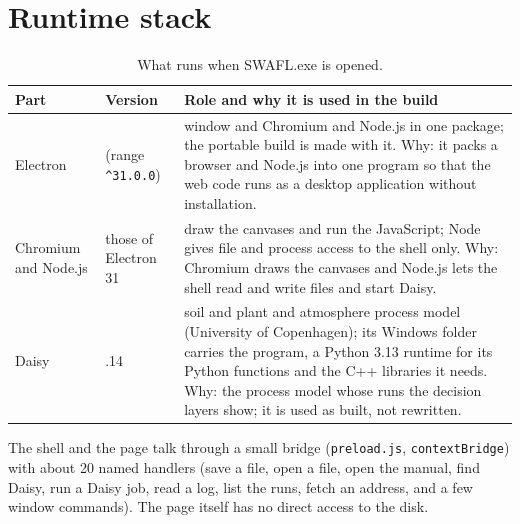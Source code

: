 \section{Runtime stack}
\begin{table}[H]\centering\small
\caption{What runs when SWAFL.exe is opened.}\label{tab:runtime}
\begin{tabular}{@{}>{\raggedright\arraybackslash}p{3.6cm}>{\raggedright\arraybackslash}p{2.8cm}>{\raggedright\arraybackslash}p{6.6cm}@{}}
\toprule Part & Version & Role and why it is used in the build\\\midrule
Electron & 31 (range \texttt{\^{}31.0.0}) & window and Chromium and Node.js in one package; the portable build is made with it. Why: it packs a browser and Node.js into one program so that the web code runs as a desktop application without installation.\\
Chromium and Node.js & those of Electron 31 & draw the canvases and run the JavaScript; Node gives file and process access to the shell only. Why: Chromium draws the canvases and Node.js lets the shell read and write files and start Daisy.\\
Daisy & 7.1.14 & soil and plant and atmosphere process model (University of Copenhagen); its Windows folder carries the program, a Python 3.13 runtime for its Python functions and the C++ libraries it needs. Why: the process model whose runs the decision layers show; it is used as built, not rewritten.\\
\bottomrule\end{tabular}\end{table}
The shell and the page talk through a small bridge (\texttt{preload.js}, \texttt{contextBridge}) with about 20 named handlers (save a file, open a file, open the manual, find Daisy, run a Daisy job, read a log, list the runs, fetch an address, and a few window commands). The page itself has no direct access to the disk.

